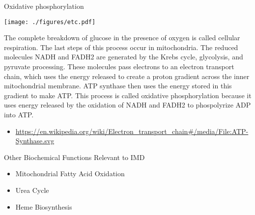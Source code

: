 \documentclass[presentation, smaller]{beamer}
\begin{document}
\begin{frame}[label={sec:orgcfaaaf8}]{Oxidative phosphorylation}
\begin{center}
\texttt{[image: ./figures/etc.pdf]}
\end{center}

The complete breakdown of glucose in the presence of oxygen is called cellular respiration. The last steps of this process occur in mitochondria. The reduced molecules NADH and FADH2 are generated by the Krebs cycle, glycolysis, and pyruvate processing. These molecules pass electrons to an electron transport chain, which uses the energy released to create a proton gradient across the inner mitochondrial membrane. ATP synthase then uses the energy stored in this gradient to make ATP. This process is called oxidative phosphorylation because it uses energy released by the oxidation of NADH and FADH2 to phospolyrize ADP into ATP. 

\begin{itemize}
\item \url{https://en.wikipedia.org/wiki/Electron\_transport\_chain\#/media/File:ATP-Synthase.svg}
\end{itemize}
\end{frame}

\begin{frame}[label={sec:orgd74cc47}]{Other Biochemical Functions Relevant to IMD}
\begin{itemize}
\item Mitochondrial Fatty Acid Oxidation

\item Urea Cycle

\item Heme Biosynthesis
\end{itemize}
\end{frame}
\end{document}
